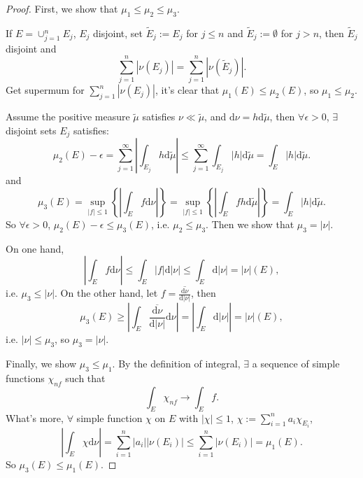 \documentclass{article}
\newcommand{\dif}{\mathrm{d}}
\newcommand{\cp}[2]{\cup_{#1=1}^{#2}}
\newcommand{\sm}[2]{\sum_{#1=1}^{#2}}
\begin{document}
\begin{proof}
    First, we show that $\mu_1\le\mu_2\le\mu_3$. 

    If $E=\cp{j}{n}E_j$, $E_j$ disjoint, 
    set $\tilde{E}_j:=E_{j}$ for $j\le n$ and 
    $\tilde{E}_j:=\emptyset$ for $j>n$, then $\tilde{E}_j$ disjoint and 
    \begin{displaymath}
        \sm{j}{n}|\nu(E_j)|=\sm{j}{n}|\nu(\tilde{E}_j)|.
    \end{displaymath}
    Get supermum for $\sm{j}{n}|\nu(E_j)|$, it's clear that $\mu_1(E)\le\mu_2(E)$, 
    so $\mu_1\le\mu_2$.

    Assume the positive measure $\tilde{\mu}$ satisfies $\nu\ll\tilde{\mu}$, 
    and $\dif\nu=h\dif\tilde{\mu}$, then $\forall\epsilon>0$, 
    $\exists$ disjoint sets $E_{j}$ satisfies:
    \begin{displaymath}
        \mu_{2}(E)-\epsilon=\sm{j}{\infty}\left|\int_{E_j}h\dif\tilde{\mu}\right|
        \le\sm{j}{\infty}\int_{E_j}|h|\dif\tilde{\mu}=\int_{E}|h|\dif\tilde{\mu}.
    \end{displaymath}
    and 
    \begin{displaymath}
        \mu_{3}(E)=\sup_{|f|\le 1}\left\{\left|\int_{E}f\dif\nu\right|\right\}
        =\sup_{|f|\le 1}\left\{\left|\int_{E}fh\dif\tilde{\mu}\right|\right\}
        =\int_{E}|h|\dif\tilde{\mu}.
    \end{displaymath}
    So $\forall\epsilon>0$, $\mu_{2}(E)-\epsilon\le\mu_{3}(E)$, i.e. 
    $\mu_{2}\le\mu_{3}$. Then we show that $\mu_{3}=|\nu|$.

    On one hand, 
    \begin{displaymath}
        \left|\int_{E}f\dif\nu\right|\le\int_{E}|f|\dif|\nu|
        \le\int_{E}\dif|\nu|=|\nu|(E),
    \end{displaymath}
    i.e. $\mu_{3}\le|\nu|$. On the other hand, let $f=\overline{\frac{\dif\nu}{\dif|\nu|}}$, 
    then 
    \begin{displaymath}
        \mu_{3}(E)\ge\left|\int_{E}\overline{\frac{\dif\nu}{\dif|\nu|}}\dif\nu\right|
        =\left|\int_{E}\dif|\nu|\right|=|\nu|(E),
    \end{displaymath}
    i.e. $|\nu|\le\mu_{3}$, so $\mu_{3}=|\nu|$.

    Finally, we show $\mu_{3}\le\mu_{1}$. By the definition of integral, 
    $\exists$ a sequence of simple functions $\chi_{nf}$ such that 
    \begin{displaymath}
        \int_{E}\chi_{nf}\rightarrow\int_{E}f.
    \end{displaymath}
    What's more, $\forall$ simple function $\chi$ on $E$ with $|\chi|\le 1$, 
    $\chi:=\sm{i}{n}a_{i}\chi_{E_i}$, 
    \begin{displaymath}
        \left|\int_{E}\chi\dif\nu\right|=\sm{i}{n}|a_i||\nu(E_i)|
        \le\sm{i}{n}|\nu(E_i)|=\mu_{1}(E).
    \end{displaymath}
    So $\mu_{3}(E)\le\mu_{1}(E)$.
\end{proof}
\end{document}
